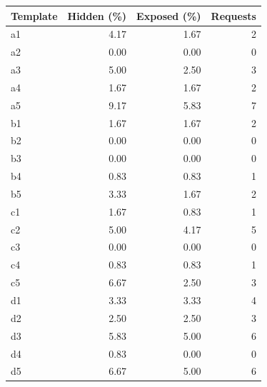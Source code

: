 \begin{tabular}{@{}lrrr@{}}
\toprule
Template & Hidden (\%) & Exposed (\%) & Requests\\
\midrule
a1 & 4.17 & 1.67 & 2\\
a2 & 0.00 & 0.00 & 0\\
a3 & 5.00 & 2.50 & 3\\
a4 & 1.67 & 1.67 & 2\\
a5 & 9.17 & 5.83 & 7\\
\midrule
b1 & 1.67 & 1.67 & 2\\
b2 & 0.00 & 0.00 & 0\\
b3 & 0.00 & 0.00 & 0\\
b4 & 0.83 & 0.83 & 1\\
b5 & 3.33 & 1.67 & 2\\
\midrule
c1 & 1.67 & 0.83 & 1\\
c2 & 5.00 & 4.17 & 5\\
c3 & 0.00 & 0.00 & 0\\
c4 & 0.83 & 0.83 & 1\\
c5 & 6.67 & 2.50 & 3\\
\midrule
d1 & 3.33 & 3.33 & 4\\
d2 & 2.50 & 2.50 & 3\\
d3 & 5.83 & 5.00 & 6\\
d4 & 0.83 & 0.00 & 0\\
d5 & 6.67 & 5.00 & 6\\
\bottomrule
\end{tabular}
